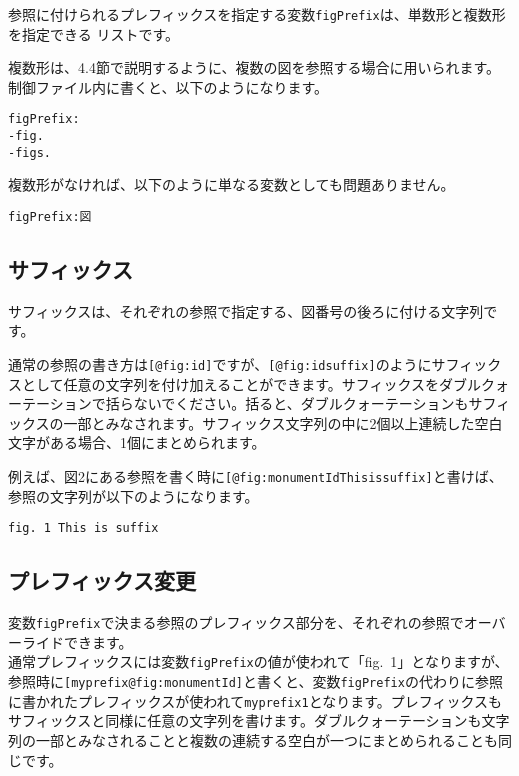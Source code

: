 参照に付けられるプレフィックスを指定する変数\texttt{figPrefix}は、単数形と複数形を指定できる
リストです。

複数形は、4.4節で説明するように、複数の図を参照する場合に用いられます。
制御ファイル内に書くと、以下のようになります。

\begin{verbatim}
figPrefix:
-fig.
-figs.
\end{verbatim}

複数形がなければ、以下のように単なる変数としても問題ありません。

\begin{verbatim}
figPrefix:図
\end{verbatim}

\subsection{サフィックス}\label{ux30b5ux30d5ux30a3ux30c3ux30afux30b9}

サフィックスは、それぞれの参照で指定する、図番号の後ろに付ける文字列です。

通常の参照の書き方は\texttt{{[}@fig:id{]}}ですが、\texttt{{[}@fig:idsuffix{]}}のようにサフィックスとして任意の文字列を付け加えることができます。サフィックスをダブルクォーテーションで括らないでください。括ると、ダブルクォーテーションもサフィックスの一部とみなされます。サフィックス文字列の中に2個以上連続した空白文字がある場合、1個にまとめられます。

例えば、図2にある参照を書く時に\texttt{{[}@fig:monumentIdThisissuffix{]}}と書けば、参照の文字列が以下のようになります。

\begin{verbatim}
fig. 1 This is suffix
\end{verbatim}

\subsection{プレフィックス変更}\label{ux30d7ux30ecux30d5ux30a3ux30c3ux30afux30b9ux5909ux66f4}

変数\texttt{figPrefix}で決まる参照のプレフィックス部分を、それぞれの参照でオーバーライドできます。\\
通常プレフィックスには変数\texttt{figPrefix}の値が使われて「fig.~1」となりますが、参照時に\texttt{{[}myprefix@fig:monumentId{]}}と書くと、変数\texttt{figPrefix}の代わりに参照に書かれたプレフィックスが使われて\texttt{myprefix1}となります。プレフィックスもサフィックスと同様に任意の文字列を書けます。ダブルクォーテーションも文字列の一部とみなされることと複数の連続する空白が一つにまとめられることも同じです。

